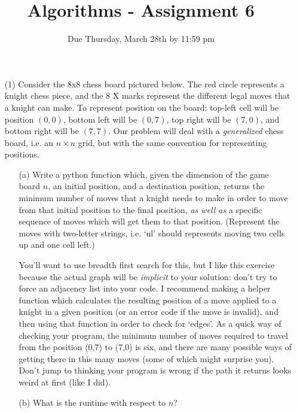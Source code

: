 \documentclass[12pt]{article}
\title{Algorithms - Assignment 6}
\date{Due Thursday, March 28th by 11:59 pm}
\begin{document}
\maketitle

\begin{enumerate}
    \item[(1)] Consider the 8x8 chess board pictured below. The red circle represents a knight chess piece, and the 8 X marks represent the different legal moves that a knight can make. To represent position on the board: top-left cell will be position $(0,0)$, bottom left will be $(0,7)$, top right will be $(7,0)$, and bottom right will be $(7,7)$. Our problem will deal with a \emph{generalized} chess board, i.e. an $n \times n$ grid, but with the same convention for representing positions. \par 
    \begin{itemize}
        \item[(a)] Write a python function which, given the dimension of the game board $n$, an initial position, and a destination position, returns the minimum number of moves that a knight needs to make in order to move from that initial position to the final position, \emph{as well as} a specific sequence of moves which will get them to that position. (Represent the moves with two-letter strings, i.e. `ul' should represents moving two cells up and one cell left.) \par 
    
        You'll want to use breadth first search for this, but I like this exercise because the actual graph will be \emph{implicit} to your solution: don't try to force an adjacency list into your code. I recommend making a helper function which calculates the resulting position of a move applied to a knight in a given position (or an error code if the move is invalid), and then using that function in order to check for `edges'. As a quick way of checking your program, the minimum number of moves required to travel from the position (0,7) to (7,0) is six, and there are many possible ways of getting there in this many moves (some of which might surprise you). Don't jump to thinking your program is wrong if the path it returns looks weird at first (like I did).
        \item[(b)] What is the runtime with respect to $n$?
    \end{itemize}
    \begin{center}
\end{center}
\end{enumerate}
\end{document}
